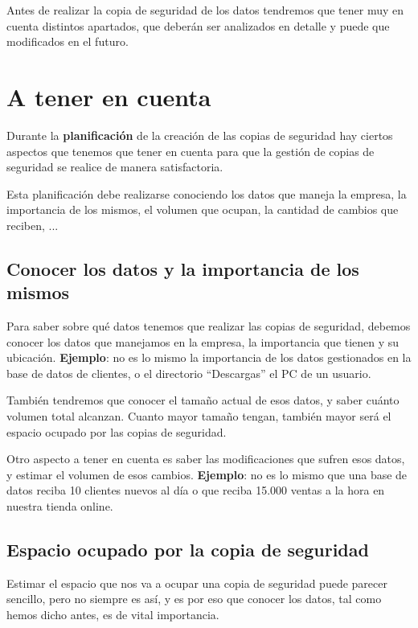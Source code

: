 Antes de realizar la copia de seguridad de los datos tendremos que tener muy en cuenta distintos apartados, que deberán ser analizados en detalle y puede que modificados en el futuro.

\section{A tener en cuenta}
Durante la \textbf{planificación} de la creación de las copias de seguridad hay ciertos aspectos que tenemos que tener en cuenta para que la gestión de copias de seguridad se realice de manera satisfactoria.

Esta planificación debe realizarse conociendo los datos que maneja la empresa, la importancia de los mismos, el volumen que ocupan, la cantidad de cambios que reciben, ...


\subsection{Conocer los datos y la importancia de los mismos}
Para saber sobre qué datos tenemos que realizar las copias de seguridad, debemos conocer los datos que manejamos en la empresa, la importancia que tienen y su ubicación. \textbf{Ejemplo}: no es lo mismo la importancia de los datos gestionados en la base de datos de clientes, o el directorio “Descargas” el PC de un usuario.

También tendremos que conocer el tamaño actual de esos datos, y saber cuánto volumen total alcanzan. Cuanto mayor tamaño tengan, también mayor será el espacio ocupado por las copias de seguridad.


Otro aspecto a tener en cuenta es saber las modificaciones que sufren esos datos, y estimar el volumen de esos cambios. \textbf{Ejemplo}: no es lo mismo que una base de datos reciba 10 clientes nuevos al día o que reciba 15.000 ventas a la hora en nuestra tienda online.



\subsection{Espacio ocupado por la copia de seguridad}
Estimar el espacio que nos va a ocupar una copia de seguridad puede parecer sencillo, pero no siempre es así, y es por eso que conocer los datos, tal como hemos dicho antes, es de vital importancia.

